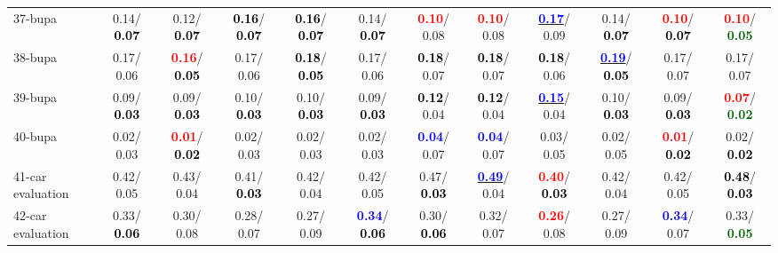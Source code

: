 \begin{table}[h]
\begin{center}
{\begin{tabular}{lc|c|c|c|c|c|c|c|c|c|c}
37-bupa &   0.14/\textcolor{black}{\textbf{  0.07}} &   0.12/\textcolor{black}{\textbf{  0.07}} & \textcolor{black}{\textbf{  0.16}}/\textcolor{black}{\textbf{  0.07}} & \textcolor{black}{\textbf{  0.16}}/\textcolor{black}{\textbf{  0.07}} &   0.14/\textcolor{black}{\textbf{  0.07}} & \textcolor{red}{\textbf{  0.10}}/  0.08 & \textcolor{red}{\textbf{  0.10}}/  0.08 & \underline{\textcolor{blue}{\textbf{  0.17}}}/  0.09 &   0.14/\textcolor{black}{\textbf{  0.07}} & \textcolor{red}{\textbf{  0.10}}/\textcolor{black}{\textbf{  0.07}} & \textcolor{red}{\textbf{  0.10}}/\textcolor{darkgreen}{\textbf{  0.05}} \\
38-bupa &   0.17/  0.06 & \textcolor{red}{\textbf{  0.16}}/\textcolor{black}{\textbf{  0.05}} &   0.17/  0.06 & \textcolor{black}{\textbf{  0.18}}/\textcolor{black}{\textbf{  0.05}} &   0.17/  0.06 & \textcolor{black}{\textbf{  0.18}}/  0.07 & \textcolor{black}{\textbf{  0.18}}/  0.07 & \textcolor{black}{\textbf{  0.18}}/  0.06 & \underline{\textcolor{blue}{\textbf{  0.19}}}/\textcolor{black}{\textbf{  0.05}} &   0.17/  0.07 &   0.17/  0.07 \\
39-bupa &   0.09/\textcolor{black}{\textbf{  0.03}} &   0.09/\textcolor{black}{\textbf{  0.03}} &   0.10/\textcolor{black}{\textbf{  0.03}} &   0.10/\textcolor{black}{\textbf{  0.03}} &   0.09/\textcolor{black}{\textbf{  0.03}} & \textcolor{black}{\textbf{  0.12}}/  0.04 & \textcolor{black}{\textbf{  0.12}}/  0.04 & \underline{\textcolor{blue}{\textbf{  0.15}}}/  0.04 &   0.10/\textcolor{black}{\textbf{  0.03}} &   0.09/\textcolor{black}{\textbf{  0.03}} & \textcolor{red}{\textbf{  0.07}}/\textcolor{darkgreen}{\textbf{  0.02}} \\ \hline
40-bupa &   0.02/  0.03 & \textcolor{red}{\textbf{  0.01}}/\textcolor{black}{\textbf{  0.02}} &   0.02/  0.03 &   0.02/  0.03 &   0.02/  0.03 & \textcolor{blue}{\textbf{  0.04}}/  0.07 & \textcolor{blue}{\textbf{  0.04}}/  0.07 &   0.03/  0.05 &   0.02/  0.05 & \textcolor{red}{\textbf{  0.01}}/\textcolor{black}{\textbf{  0.02}} &   0.02/\textcolor{black}{\textbf{  0.02}} \\
41-car evaluation &   0.42/  0.05 &   0.43/  0.04 &   0.41/\textcolor{black}{\textbf{  0.03}} &   0.42/  0.04 &   0.42/  0.05 &   0.47/\textcolor{black}{\textbf{  0.03}} & \underline{\textcolor{blue}{\textbf{  0.49}}}/  0.04 & \textcolor{red}{\textbf{  0.40}}/\textcolor{black}{\textbf{  0.03}} &   0.42/  0.04 &   0.42/  0.05 & \textcolor{black}{\textbf{  0.48}}/\textcolor{black}{\textbf{  0.03}} \\
42-car evaluation &   0.33/\textcolor{black}{\textbf{  0.06}} &   0.30/  0.08 &   0.28/  0.07 &   0.27/  0.09 & \textcolor{blue}{\textbf{  0.34}}/\textcolor{black}{\textbf{  0.06}} &   0.30/\textcolor{black}{\textbf{  0.06}} &   0.32/  0.07 & \textcolor{red}{\textbf{  0.26}}/  0.08 &   0.27/  0.09 & \textcolor{blue}{\textbf{  0.34}}/  0.07 &   0.33/\textcolor{darkgreen}{\textbf{  0.05}} \\

\end{tabular}}
\end{center}
\end{table}
